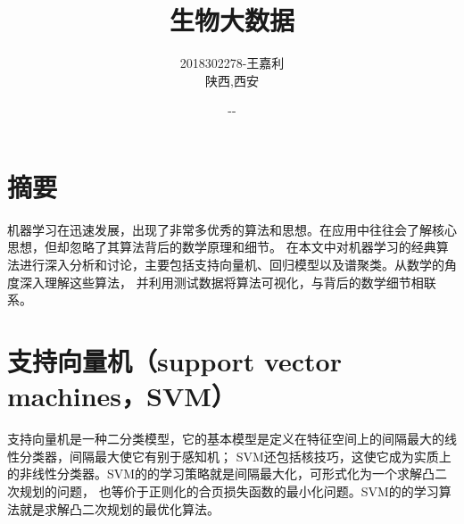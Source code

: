 \documentclass[UTF8]{ctexart}
\begin{document}


\renewcommand{\contentsname}{Contents}
\renewcommand{\bibname}{reference}

\renewcommand{\today}{\number\year-\number\month-\number\day}

\title{{\Huge 生物大数据\linebreak\linebreak}}
\author{\Large 2018302278-王嘉利 \\ 陕西,西安}
\date{\today}
\maketitle
\setcounter{secnumdepth}{4}


\section*{摘要} 

机器学习在迅速发展，出现了非常多优秀的算法和思想。在应用中往往会了解核心思想，但却忽略了其算法背后的数学原理和细节。
在本文中对机器学习的经典算法进行深入分析和讨论，主要包括支持向量机、回归模型以及谱聚类。从数学的角度深入理解这些算法，
并利用测试数据将算法可视化，与背后的数学细节相联系。



\section{支持向量机（support vector machines，SVM）}

支持向量机是一种二分类模型，它的基本模型是定义在特征空间上的间隔最大的线性分类器，间隔最大使它有别于感知机；
SVM还包括核技巧，这使它成为实质上的非线性分类器。SVM的的学习策略就是间隔最大化，可形式化为一个求解凸二次规划的问题，
也等价于正则化的合页损失函数的最小化问题。SVM的的学习算法就是求解凸二次规划的最优化算法。




\end{document}
